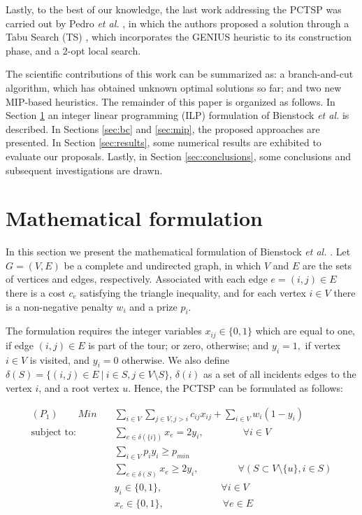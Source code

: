\documentclass{ro}
\begin{document}
Lastly, to the best of our knowledge, the last work addressing the PCTSP was carried out by Pedro \textit{et al.} \cite{pedro2013tabu}, in which the authors proposed a solution through a Tabu Search (TS) \cite{laguna2018tabu}, which incorporates the GENIUS \cite{genius} heuristic to its construction phase, and a 2-opt local search.

The  scientific contributions of this work can be summarized as: a branch-and-cut algorithm, which has obtained unknown optimal solutions so far; and two new MIP-based heuristics. The remainder of this paper is organized as follows. In Section \ref{sec:mf} an integer linear programming (ILP) formulation of Bienstock \textit{et al.}\cite{bienstock1993note} is described. In Sections \ref{sec:bc} and \ref{sec:mip}, the proposed approaches are presented. In Section \ref{sec:results}, some numerical results are exhibited to evaluate our proposals. Lastly, in Section \ref{sec:conclusions}, some conclusions and subsequent investigations are drawn.


\section{Mathematical formulation}
\label{sec:mf}




In this section we present the mathematical formulation of Bienstock \textit{et al.} \cite{bienstock1993note}. 
Let $G = (V, E)$ be a complete and undirected graph, in which $V$ and $E$ are the sets of vertices and edges, respectively. Associated with each edge $e = (i, j) \in E$ there is a cost $c_e$ satisfying the triangle inequality, and for each vertex $i \in V$ there is a non-negative penalty $w_i$ and a prize $p_i$.

 The formulation requires the integer variables $x_{ij} \in \{0, 1\}$ which are equal to one, if edge $(i, j) \in E $
is part of the tour; or zero, otherwise; and  $y_i =  1,$ if vertex  $i \in V$ is visited, and $y_i=0$  otherwise. We also define $\delta(S) = \{ (i,j) \in E \ | \ i \in S, j \in V \setminus S \}$, $\delta(i)$ as a set of all incidents edges to the vertex $i$, and a root vertex $u$. Hence, the PCTSP can be formulated as follows:

	\begin{align}
(P_1) \qquad	Min \quad  &\sum_{i \in V} \sum_{j \in V, j > i} c_{ij}x_{ij} + \sum_{i \in V} w_i (1 - y_i)  \label{naodir1}\\
	\text{subject to:}
	&\sum_{e \in \delta(\{i\})} x_e = 2 y_i,  \qquad \qquad \forall i \in V\label{naodir2}\\
	&\sum_{i \in V}p_iy_i \geq p_{min} \label{naodir3}\\
	&\sum_{e \in \delta(S)} x_e \geq 2 y_i, \qquad  \qquad \forall (S \subset V \setminus \{u\}, i \in S) \label{naodir4}\\
	&y_i \in \{0,1\}, \qquad \qquad \qquad \forall i \in V \label{naodir5}\\
	&x_e \in \{0,1\}, \qquad \qquad \qquad \forall e \in E \label{naodir6} 
	\end{align}
\end{document}
